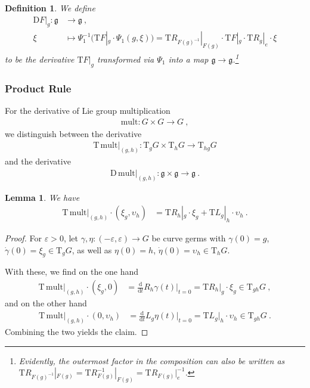 \documentclass[10pt,a4paper]{article}
\theoremstyle{mytheorem}
\newtheorem{lemma}[theorem]{Lemma}
\theoremstyle{mydefinition}
\newtheorem{definition}[theorem]{Definition}
\newcommand{\dt}{\mathrm{d}}
\newcommand{\Dt}{\mathrm{D}}
\newcommand{\Tt}{\mathrm{T}}
\newcommand{\fg}{\mathfrak{g}}
\begin{document}
\begin{definition}
We define
\begin{align*}
	\Dt F|_g: 
	\mathfrak{g} &\rightarrow \mathfrak{g}
	\ ,\nonumber\\
	\xi &\mapsto 
	\Psi_1^{-1}\big(
		\Tt F|_g
		\cdot \Psi_1(g, \xi)
	\big)
	=
	\Tt R_{F(g)^{-1}}|_{F(g)}
	\cdot \Tt F|_g
	\cdot \Tt R_{g}|_e\cdot\xi
\end{align*}
to be the derivative $\Tt F|_g$ transformed via $\Psi_1$ into a map $\fg\rightarrow\fg$.\footnote{
	Evidently, the outermost factor in the composition can also be written as $\Tt R_{F(g)^{-1}}|_{F(g)}=\Tt R_{F(g)}^{-1}|_{F(g)}=\Tt R_{F(g)}|_e^{-1}$.
}
\end{definition}

\subsubsection{Product Rule}

For the derivative of Lie group multiplication
\begin{align*}
	\mathrm{mult}:G\times G\rightarrow G
	\ ,
\end{align*}
we distinguish between the derivative
\begin{align*}
	\Tt\,\mathrm{mult}|_{(g,h)}:\Tt_gG\times\Tt_hG\rightarrow\Tt_{hg}G
\end{align*}
and the derivative
\begin{align*}
	\Dt\,\mathrm{mult}|_{(g,h)}:\fg\times\fg\rightarrow\fg
	\ .
\end{align*}

\begin{lemma}
\label{th:Tmult}
We have
\begin{align*}
	\Tt\,\mathrm{mult}|_{(g,h)}\cdot (\xi_g, \upsilon_h)
	&= \Tt R_h|_g\cdot\xi_g + \Tt L_g|_h\cdot\upsilon_h
	\ .
\end{align*}
\end{lemma}

\begin{proof}
For $\varepsilon>0$, let $\gamma,\eta: (-\varepsilon,\varepsilon)\rightarrow G$ be curve germs with $\gamma(0)=g$, $\dot{\gamma}(0)=\xi_g\in\Tt_gG$, as well as $\eta(0)=h$, $\dot{\eta}(0)=\upsilon_h\in\Tt_hG$.

With these, we find on the one hand
\begin{align*}
	\Tt\,\mathrm{mult}|_{(g,h)}\cdot (\xi_g, 0)
	&= \frac{\dt}{\dt t}
		R_h\gamma(t)
	\Big|_{t=0}
	= \Tt R_h|_g\cdot\xi_g
	\in \Tt_{gh}G
	\ ,
\end{align*}
and on the other hand
\begin{align*}
	\Tt\,\mathrm{mult}|_{(g,h)}\cdot (0, \upsilon_h)
	&= \frac{\dt}{\dt t}
		L_g\eta(t)
	\Big|_{t=0}
	= \Tt L_g|_h\cdot\upsilon_h
	\in \Tt_{gh}G
	\ .
\end{align*}
Combining the two yields the claim.
\end{proof}
\end{document}
